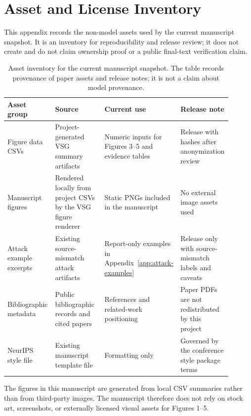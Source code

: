 \section{Asset and License Inventory}
\label{app:asset-licenses}

This appendix records the non-model assets used by the current manuscript
snapshot.  It is an inventory for reproducibility and release review; it does
not create and do not claim ownership proof or a public final-text
verification claim.

\begin{table}[t]
\centering
\scriptsize
\setlength{\tabcolsep}{3pt}
\renewcommand{\arraystretch}{1.12}
\begin{tabular}{p{0.22\linewidth}p{0.27\linewidth}p{0.20\linewidth}p{0.21\linewidth}}
\toprule
Asset group & Source & Current use & Release note \\
\midrule
Figure data CSVs & Project-generated VSG summary artifacts & Numeric inputs for Figures 3--5 and evidence tables & Release with hashes after anonymization review \\
Manuscript figures & Rendered locally from project CSVs by the VSG figure renderer & Static PNGs included in the manuscript & No external image assets used \\
Attack example excerpts & Existing source-mismatch attack artifacts & Report-only examples in Appendix~\ref{app:attack-examples} & Release only with source-mismatch labels and caveats \\
Bibliographic metadata & Public bibliographic records and cited papers & References and related-work positioning & Paper PDFs are not redistributed by this project \\
NeurIPS style file & Existing manuscript template file & Formatting only & Governed by the conference style package terms \\
\bottomrule
\end{tabular}
\caption{Asset inventory for the current manuscript snapshot.  The table
records provenance of paper assets and release notes; it is not a claim about
model provenance.}
\label{tab:asset-license-inventory}
\end{table}

The figures in this manuscript are generated from local CSV summaries rather
than from third-party images.  The manuscript therefore does not rely on stock
art, screenshots, or externally licensed visual assets for Figures 1--5.

